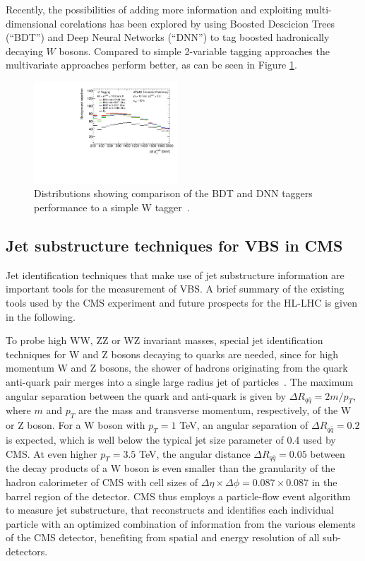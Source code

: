 Recently, the possibilities of adding more information and exploiting multi-dimensional corelations has been explored by using Boosted Descicion Trees (``BDT'') and Deep Neural Networks (``DNN'') to tag boosted hadronically decaying $W$ bosons. Compared to simple 2-variable tagging approaches the multivariate approaches perform better, as can be seen in Figure \ref{fig:MVA}.



\begin{figure}[!h]
\begin{centering}
\includegraphics[width=0.48\textwidth]{WG3_plots/fig_07c}
\caption{Distributions showing comparison of the BDT and DNN taggers performance to a simple W tagger~\cite{ATL-PHYS-PUB-2017-004}.}
\label{fig:MVA}
\end{centering}
\end{figure}



\subsection{Jet substructure techniques for VBS in CMS}

Jet identification techniques that make use of jet substructure information are important tools for the measurement of VBS.
A brief summary of the existing tools used by the CMS experiment and future prospects for the HL-LHC is given in the following.

To probe high WW, ZZ or WZ invariant masses, special jet identification techniques for W and Z bosons decaying to quarks are needed, since for high momentum W and Z bosons, the shower of hadrons originating from the quark anti-quark pair merges into a single large radius jet of particles~\cite{CMS-PAS-JME-16-003, CMS-PAS-JME-14-002, Khachatryan:2014vla}.
The maximum angular separation between the quark and anti-quark is given by $\Delta R_{q\bar{q}}=2 m / p_{T}$, where $m$ and $p_T$ are the mass and transverse momentum, respectively, of the W or Z boson.
For a W boson with $p_T=1$ TeV, an angular separation of  $\Delta R_{q\bar{q}}=0.2$ is expected, which is well below the typical jet size parameter of 0.4 used by CMS.
At even higher $p_T=3.5$ TeV, the angular distance $\Delta R_{q\bar{q}}=0.05$ between the decay products of a W boson is even smaller than the granularity of the hadron calorimeter of CMS with cell sizes of $\Delta \eta \times \Delta \phi = 0.087 \times 0.087$ in the barrel region of the detector.
CMS thus employs a particle-flow event algorithm~\cite{Sirunyan:2017ulk} to measure jet substructure, that reconstructs and identifies each individual particle with an optimized combination of information from the various elements of the CMS detector, benefiting from spatial and energy resolution of all sub-detectors.

